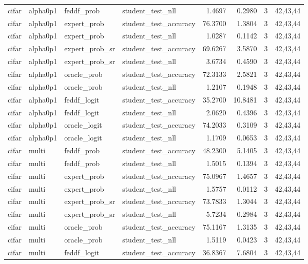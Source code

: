 \begin{tabular}{llllrrrl}
cifar & alpha0p1 & feddf\_prob & student\_test\_nll & 1.4697 & 0.2980 & 3 & 42,43,44 \\
cifar & alpha0p1 & expert\_prob & student\_test\_accuracy & 76.3700 & 1.3804 & 3 & 42,43,44 \\
cifar & alpha0p1 & expert\_prob & student\_test\_nll & 1.0287 & 0.1142 & 3 & 42,43,44 \\
cifar & alpha0p1 & expert\_prob\_sr & student\_test\_accuracy & 69.6267 & 3.5870 & 3 & 42,43,44 \\
cifar & alpha0p1 & expert\_prob\_sr & student\_test\_nll & 3.6734 & 0.4590 & 3 & 42,43,44 \\
cifar & alpha0p1 & oracle\_prob & student\_test\_accuracy & 72.3133 & 2.5821 & 3 & 42,43,44 \\
cifar & alpha0p1 & oracle\_prob & student\_test\_nll & 1.2107 & 0.1948 & 3 & 42,43,44 \\
cifar & alpha0p1 & feddf\_logit & student\_test\_accuracy & 35.2700 & 10.8481 & 3 & 42,43,44 \\
cifar & alpha0p1 & feddf\_logit & student\_test\_nll & 2.0620 & 0.4396 & 3 & 42,43,44 \\
cifar & alpha0p1 & oracle\_logit & student\_test\_accuracy & 74.2033 & 0.3109 & 3 & 42,43,44 \\
cifar & alpha0p1 & oracle\_logit & student\_test\_nll & 1.1709 & 0.0653 & 3 & 42,43,44 \\
cifar & multi & feddf\_prob & student\_test\_accuracy & 48.2300 & 5.1405 & 3 & 42,43,44 \\
cifar & multi & feddf\_prob & student\_test\_nll & 1.5015 & 0.1394 & 3 & 42,43,44 \\
cifar & multi & expert\_prob & student\_test\_accuracy & 75.0967 & 1.4657 & 3 & 42,43,44 \\
cifar & multi & expert\_prob & student\_test\_nll & 1.5757 & 0.0112 & 3 & 42,43,44 \\
cifar & multi & expert\_prob\_sr & student\_test\_accuracy & 73.7833 & 1.3044 & 3 & 42,43,44 \\
cifar & multi & expert\_prob\_sr & student\_test\_nll & 5.7234 & 0.2984 & 3 & 42,43,44 \\
cifar & multi & oracle\_prob & student\_test\_accuracy & 75.1167 & 1.3135 & 3 & 42,43,44 \\
cifar & multi & oracle\_prob & student\_test\_nll & 1.5119 & 0.0423 & 3 & 42,43,44 \\
cifar & multi & feddf\_logit & student\_test\_accuracy & 36.8367 & 7.6804 & 3 & 42,43,44 \\

\end{tabular}
